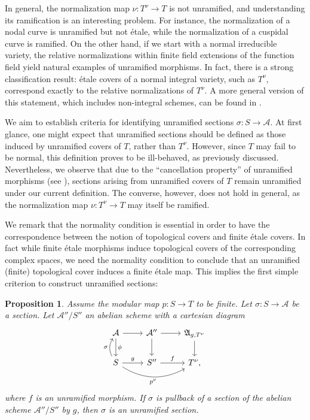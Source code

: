 \documentclass[10 pt,a4paper]{article}
\theoremstyle{plain}
\newtheorem{prop}[thm]{Proposition}
\theoremstyle{definition}
\theoremstyle{named}
\newcommand{\cA}{\mathcal A}
\newcommand{\fA}{\mathfrak A}
\begin{document}
In general, the normalization map $\nu \colon T^\nu \to T$ is not unramified, and understanding its ramification is an interesting problem. For instance, the normalization of a nodal curve is unramified but not étale, while the normalization of a cuspidal curve is ramified.  On the other hand, if we start with a normal irreducible variety, the relative normalizations within finite field extensions of the function field yield natural examples of unramified morphisms. In fact, there is a strong classification result: étale covers of a normal integral variety, such as $T^\nu$, correspond exactly to the relative normalizations of $T^\nu$. A more general version of this statement, which includes non-integral schemes, can be found in \cite[Exposé I, Corollaire~10.2 and Corollaire~10.3]{SGA1}.

We aim to establish criteria for identifying unramified sections $\sigma \colon S \to \mathcal{A}$. At first glance, one might expect that unramified sections should be defined as those induced by unramified covers of $T$, rather than $T^\nu$. However, since $T$ may fail to be normal, this definition proves to be ill-behaved, as previously discussed.   Nevertheless, we observe that due to the ``cancellation property'' of unramified morphisms (see \cite[TAG 02GG]{stacks-project}), sections arising from unramified covers of $T$ remain unramified under our current definition. The converse, however, does not hold in general, as the normalization map $\nu \colon T^\nu \to T$ may itself be ramified.

We remark that the normality condition is essential in order to have the correspondence between the notion of topological covers and finite étale covers. In fact while finite étale morphisms induce topological covers of the corresponding complex spaces, we need the normality condition to conclude that an unramified (finite) topological cover induces a finite étale map. This implies the first simple criterion to construct unramified sections:
\begin{prop}\label{prop:unramifiedMiddle}
    Assume the modular map $p:S \to T$ to be finite. Let $\sigma:S \to \cA$ be a section. Let $\cA''/S''$ an abelian scheme with a cartesian diagram
    \[
    \begin{tikzcd}
        \cA \arrow{r} \arrow{d}{\phi} & \cA'' \arrow{r} \arrow{d} & \fA_{g,T^\nu} \arrow{d}\\
        S \arrow[bend left]{u}{\sigma} \arrow{r}{g} \arrow[bend right, swap]{rr}{p^\nu} & S'' \arrow{r}{f} & T^\nu,
    \end{tikzcd}
    \]
    where $f$ is an unramified morphism. If $\sigma$ is pullback of a section of the abelian scheme $\cA''/S''$ by $g$, then $\sigma$ is an unramified section.
\end{prop}
\end{document}
